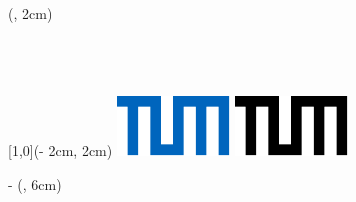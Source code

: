 \begin{titlepage}

\begin{textblock*}{\textwidth}(\borderleft, 2cm)%
    	\setlength{\baselineskip}{11pt}%
    	\ifx \monochromeCover \undefined
        	\textcolor{UniversitaetFarbe} { %
        	\fontsize{9}{11}\selectfont%
        	\sffamily \chair\\%
        	\sffamily \faculty\\%
        	\sffamily \uni }
        \else
        	\textcolor{black} { %
        	\fontsize{9}{11}\selectfont%
        	\sffamily \chair\\%
        	\sffamily \faculty\\%
        	\sffamily \uni }
        \fi
\end{textblock*}%

\begin{textblock*}{\UniversitaetLogoBreite}[1,0](\paperwidth - 2cm, 2cm)%
		\ifx \monochromeCover \undefined
        	\includegraphics{images/TUM_Logos/TUM_blau.pdf}%
        \else
        	\includegraphics{images/TUM_Logos/TUM_schwarz.pdf}%
        \fi
\end{textblock*}%

\begin{textblock*}{\textwidth - \borderleft}(\borderleft , 6cm)%
{\sffamily \Large \worktype}\\
{\sffamily \huge \titleFirstLanguage \par} %
~\\
\sffamily \Large \textbf{\authorname}\\
\end{textblock*}

~\\ %
\end{titlepage}